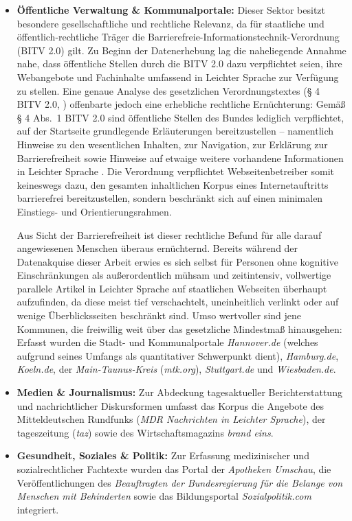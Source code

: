 \begin{itemize}
    \item \textbf{Öffentliche Verwaltung \& Kommunalportale:} Dieser Sektor besitzt besondere gesellschaftliche und rechtliche Relevanz, da für staatliche und öffentlich-rechtliche Träger die Barrierefreie-Informationstechnik-Verordnung (BITV 2.0) gilt. Zu Beginn der Datenerhebung lag die naheliegende Annahme nahe, dass öffentliche Stellen durch die BITV 2.0 dazu verpflichtet seien, ihre Webangebote und Fachinhalte umfassend in Leichter Sprache zur Verfügung zu stellen. Eine genaue Analyse des gesetzlichen Verordnungstextes (§ 4 BITV 2.0, \citealp{bitv2019}) offenbarte jedoch eine erhebliche rechtliche Ernüchterung: Gemäß § 4 Abs.~1 BITV 2.0 sind öffentliche Stellen des Bundes lediglich verpflichtet, auf der Startseite grundlegende Erläuterungen bereitzustellen – namentlich Hinweise zu den wesentlichen Inhalten, zur Navigation, zur Erklärung zur Barrierefreiheit sowie Hinweise auf etwaige weitere vorhandene Informationen in Leichter Sprache \citep{bund2026barrierefreiheit}. Die Verordnung verpflichtet Webseitenbetreiber somit keineswegs dazu, den gesamten inhaltlichen Korpus eines Internetauftritts barrierefrei bereitzustellen, sondern beschränkt sich auf einen minimalen Einstiegs- und Orientierungsrahmen.
    
    Aus Sicht der Barrierefreiheit ist dieser rechtliche Befund für alle darauf angewiesenen Menschen überaus ernüchternd. Bereits während der Datenakquise dieser Arbeit erwies es sich selbst für Personen ohne kognitive Einschränkungen als außerordentlich mühsam und zeitintensiv, vollwertige parallele Artikel in Leichter Sprache auf staatlichen Webseiten überhaupt aufzufinden, da diese meist tief verschachtelt, uneinheitlich verlinkt oder auf wenige Überblicksseiten beschränkt sind. Umso wertvoller sind jene Kommunen, die freiwillig weit über das gesetzliche Mindestmaß hinausgehen: Erfasst wurden die Stadt- und Kommunalportale \textit{Hannover.de} (welches aufgrund seines Umfangs als quantitativer Schwerpunkt dient), \textit{Hamburg.de}, \textit{Koeln.de}, der \textit{Main-Taunus-Kreis} (\textit{mtk.org}), \textit{Stuttgart.de} und \textit{Wiesbaden.de}.
    \item \textbf{Medien \& Journalismus:} Zur Abdeckung tagesaktueller Berichterstattung und nachrichtlicher Diskursformen umfasst das Korpus die Angebote des Mitteldeutschen Rundfunks (\textit{MDR Nachrichten in Leichter Sprache}), der tageszeitung (\textit{taz}) sowie des Wirtschaftsmagazins \textit{brand eins}.
    \item \textbf{Gesundheit, Soziales \& Politik:} Zur Erfassung medizinischer und sozialrechtlicher Fachtexte wurden das Portal der \textit{Apotheken Umschau}, die Veröffentlichungen des \textit{Beauftragten der Bundesregierung für die Belange von Menschen mit Behinderten} sowie das Bildungsportal \textit{Sozialpolitik.com} integriert.
\end{itemize}

